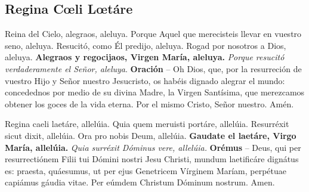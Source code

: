 \documentclass[./devocionario.tex]{subfiles}
\begin{document}
\subsection*{Regina Cœli Lœtáre}
\begin{multicols}{2}

    Reina del Cielo, alegraos, aleluya.\newline
    Porque Aquel que merecisteis llevar en vuestro seno, aleluya.\newline
    Resucitó, como Él predijo, aleluya.\newline
    Rogad por nosotros a Dios, aleluya.\newline
    \textbf{Alegraos y regocijaos, Virgen María, aleluya.}\newline
    \textit{Porque resucitó verdaderamente el Señor, aleluya}.\newline
    \textbf{Oración} -- Oh Dios, que, por la resurreción de vuestro Hijo y Señor nuestro Jesucristo, 
    os habéis dignado alegrar el mundo: concedednos por medio de su divina Madre, la Virgen Santísima, 
    que merezcamos obtener los goces de la vida eterna. Por el mismo Cristo, Señor nuestro. Amén.

    \columnbreak

    Regina caeli laetáre, allelúia.\newline
    Quia quem meruisti portáre, allelúia.\newline
    Resurréxit sicut dixit, allelúia.\newline
    Ora pro nobis Deum, allelúia.\newline
    \textbf{Gaudate el laetáre, Virgo María, allelúia.}\newline
    \textit{Quia surréxit Dóminus vere, allelúia.}\newline
    \textbf{Orémus} -- Deus, qui per resurrectiónem Filii tui Dómini nostri Jesu Christi, 
    mundum laetificáre dignátus es: praesta, quáesumus, ut per ejus Genetricem Vírginem Maríam, 
    perpétuae capiámus gáudia vitae. Per eúmdem Christum Dóminum nostrum. Amen.
\end{multicols}
\end{document}
